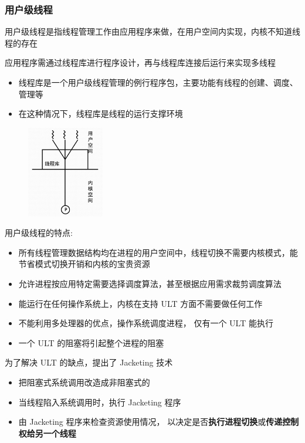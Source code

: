 \documentclass[cs4size,a4paper,10pt]{ctexart}
\begin{document}
	\subsubsection{用户级线程}
	用户级线程是指线程管理工作由应用程序来做，在用户空间内实现，内核不知道线程的存在

	应用程序需通过线程库进行程序设计，再与线程库连接后运行来实现多线程
	\begin{itemize}
		\item 线程库是一个用户级线程管理的例行程序包，主要功能有线程的创建、调度、管理等
		\item 在这种情况下，线程库是线程的运行支撑环境
	\end{itemize}
	\begin{figure}[H]
		\centering
		\includegraphics[width=0.3\textwidth]{img/2.4.2.2}
	\end{figure}

	用户级线程的特点:
	\begin{itemize}
		\item 所有线程管理数据结构均在进程的用户空间中，线程切换不需要内核模式，能节省模式切换开销和内核的宝贵资源
		\item 允许进程按应用特定需要选择调度算法，甚至根据应用需求裁剪调度算法
		\item 能运行在任何操作系统上，内核在支持 ULT 方面不需要做任何工作
		\item 不能利用多处理器的优点，操作系统调度进程， 仅有一个 ULT 能执行
		\item 一个 ULT 的阻塞将引起整个进程的阻塞
	\end{itemize}

	为了解决 ULT 的缺点，提出了 Jacketing 技术
	\begin{itemize}
		\item 把阻塞式系统调用改造成非阻塞式的
		\item 当线程陷入系统调用时，执行 Jacketing 程序
		\item 由 Jacketing 程序来检查资源使用情况， 以决定是否\textbf{执行进程切换}或\textbf{传递控制权给另一个线程}
	\end{itemize}
\end{document}
